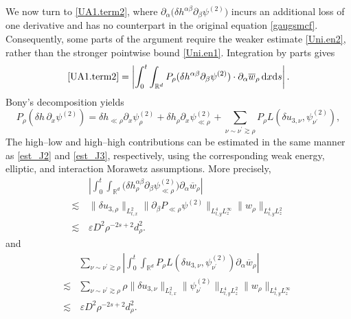 \documentclass[11pt,letterpaper,reqno]{amsart}
\numberwithin{equation}{section}
\theoremstyle{definition}
\theoremstyle{remark}
\begin{document}
We now turn to \eqref{UA1.term2},   where \( \partial_\alpha
\big(\delta h^{\alpha\beta}\partial_\beta\psi^{(2)}\big)\) incurs an additional loss of one derivative and has no counterpart in the original equation \eqref{gaugsmcf}. Consequently, some parts of the argument require the weaker estimate \eqref{Uni.en2}, rather than the stronger pointwise bound \eqref{Uni.en1}.
Integration by parts gives
\[
\eqref{UA1.term2}=\left|
\int_0^t\int_{\mathbb R^d}
P_\rho
(\delta h^{\alpha\beta}\partial_\beta\psi^{(2)})\cdot
\partial_\alpha\overline{w}_\rho\,\mathrm{d} x \mathrm{d} s 
\right|.
\]
Bony's decomposition yields
\[
P_\rho (\delta h\,\partial_x\psi^{(2)})
=
 \delta h_{\ll\rho}\partial_x\psi_\rho^{(2)}
+
\delta h_\rho\partial_x\psi_{\ll\rho}^{(2)}
+
\sum_{\nu \sim \nu^\prime\gtrsim \rho} P_\rho L( 
\delta u_{3,\nu},\psi_{  \nu^\prime}^{(2)}),
\]
The high--low and high--high contributions can be estimated in the same manner as \eqref{est_J2} and \eqref{est_J3}, respectively, using the corresponding weak energy, elliptic, and interaction Morawetz assumptions. More precisely,
\begin{align*}
   &\,
\left|
\int_0^t\int_{\mathbb R^d}
\big(
\delta h_\rho^{\alpha\beta}
\partial_\beta\psi_{\ll\rho}^{(2)}
\big)
\partial_\alpha\overline{w}_\rho
\right|\\
\lesssim &\,    
\|\delta u_{3,\rho}\|_{L^2_{t,x}}
\|  \partial_\beta P_{\ll \rho} \psi^{(2)}\|_{L^4_{t,y} L^\infty_z}
\|w_\rho\|_{L^4_{t,y} L^2_z}
\\
\lesssim &\,  \varepsilon D^2 \rho^{-2s+2} d_\rho^2.
\end{align*}
and
\begin{align*}
  & \sum_{\nu \sim \nu^\prime\gtrsim\rho}
\left|
\int_0^t\int_{\mathbb R^d}
 P_\rho L( 
\delta u_{3,\nu},\psi_{  \nu^\prime}^{(2)})
 \partial_\alpha \overline{w}_\rho
\right| \\
\lesssim &   \sum_{\nu \sim \nu^\prime\gtrsim\rho} \rho \|\delta u_{3,\nu}\|_{L^2_{t,x}}
\| \psi_{  \nu^\prime}^{(2)}\|_{L^4_{t,y} L^2_z}
\|w_\rho\|_{L^4_{t,y} L^\infty_z} \\
\lesssim & \, \varepsilon D^2 \rho^{-2s+2} d_\rho^2.
\end{align*} 
\end{document}

